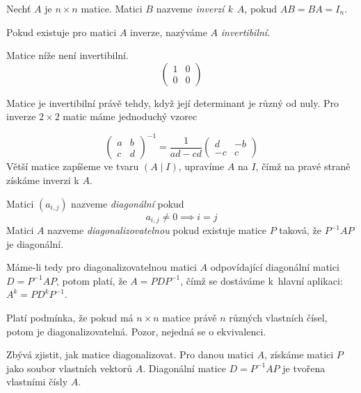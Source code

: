 \begin{definition}
    Nechť $A$ je $n \times n$ matice. Matici $B$ nazveme
    {\em inverzí k}~$A$, pokud $AB = BA = I_n$.

    Pokud existuje pro matici $A$ inverze, nazýváme $A$
    {\em invertibilní}.
\end{definition}

\begin{example}
    Matice níže není invertibilní.
    \[
        \begin{pmatrix}
            1 & 0 \\
            0 & 0
        \end{pmatrix}
    \]
\end{example}

Matice je invertibilní právě tehdy, když její determinant je různý od
nuly. Pro inverze $2 \times 2$ matic máme jednoduchý vzorec

    \[
        \begin{pmatrix}
            a & b \\
            c & d
        \end{pmatrix}^{-1}
        =
        \frac{1}{ad - cd}
        \begin{pmatrix}
            d & -b \\
            -c & c
        \end{pmatrix}
    \]
Větší matice zapíšeme ve tvaru $(A \mid I)$, upravíme $A$ na $I$, čímž
na pravé straně získáme inverzi k $A$.

\begin{definition}
    Matici $(a_{i,j})$ nazveme {\em diagonální} pokud
    \[ a_{i,j} \neq 0 \implies i = j \]
    Matici $A$ nazveme {\em diagonalizovatelnou} pokud existuje matice
    $P$ taková, že \linebreak $P^{-1} A P$ je diagonální.
\end{definition}

Máme-li tedy pro diagonalizovatelnou matici $A$ odpovídající diagonální
matici $D = P^{-1} A P$, potom platí, že $A = P D P^{-1}$, čímž se
dostáváme k~hlavní aplikaci: $A^k = P D^k P^{-1}$.

Platí podmínka, že pokud má $n \times n$ matice právě $n$ různých
vlastních čísel, potom je diagonalizovatelná. Pozor, nejedná se o
ekvivalenci.

Zbývá zjistit, jak matice diagonalizovat.
Pro danou matici $A$, získáme matici $P$ jako
soubor vlastních vektorů $A$. Diagonální matice
$D = P^{-1} A P$ je tvořena vlastními čísly $A$.

